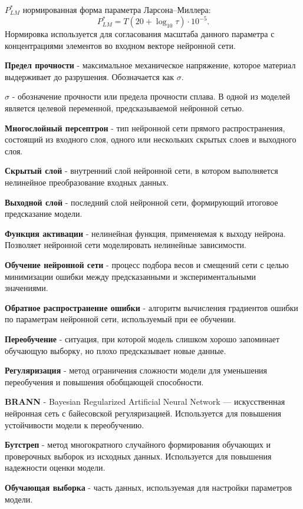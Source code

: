 \textbf{$P_{LM}^{*}$} нормированная форма параметра Ларсона--Миллера:
$$P_{LM}^{*}=T(20+\log_{10}\tau)\cdot 10^{-5}.$$
Нормировка используется для согласования масштаба данного параметра с 
концентрациями элементов во входном векторе нейронной сети.

\textbf{Предел прочности} - максимальное механическое напряжение, 
которое материал выдерживает до разрушения. Обозначается как $\sigma$.

\textbf{$\sigma$} - обозначение прочности или предела прочности сплава.
В одной из моделей является целевой переменной, предсказываемой 
нейронной сетью.

\textbf{Многослойный персептрон} - тип нейронной сети прямого 
распространения, состоящий из входного слоя, одного или нескольких 
скрытых слоев и выходного слоя.

\textbf{Скрытый слой} - внутренний слой нейронной сети, в котором 
выполняется нелинейное преобразование входных данных.

\textbf{Выходной слой} - последний слой нейронной сети, формирующий 
итоговое предсказание модели.

\textbf{Функция активации} - нелинейная функция, применяемая к выходу 
нейрона. Позволяет нейронной сети моделировать нелинейные зависимости.

\textbf{Обучение нейронной сети} - процесс подбора весов и смещений 
сети с целью минимизации ошибки между предсказанными и экспериментальными 
значениями.

\textbf{Обратное распространение ошибки} - алгоритм вычисления 
градиентов ошибки по параметрам нейронной сети, используемый при ее 
обучении.

\textbf{Переобучение} - ситуация, при которой модель слишком хорошо 
запоминает обучающую выборку, но плохо предсказывает новые данные.

\textbf{Регуляризация} - метод ограничения сложности модели для 
уменьшения переобучения и повышения обобщающей способности.

\textbf{BRANN} - Bayesian Regularized Artificial Neural Network --- 
искусственная нейронная сеть с байесовской регуляризацией. 
Используется для повышения устойчивости модели к переобучению.

\textbf{Бутстреп} - метод многократного случайного формирования 
обучающих и проверочных выборок из исходных данных. Используется 
для повышения надежности оценки модели.

\textbf{Обучающая выборка} - часть данных, используемая для настройки 
параметров модели.

